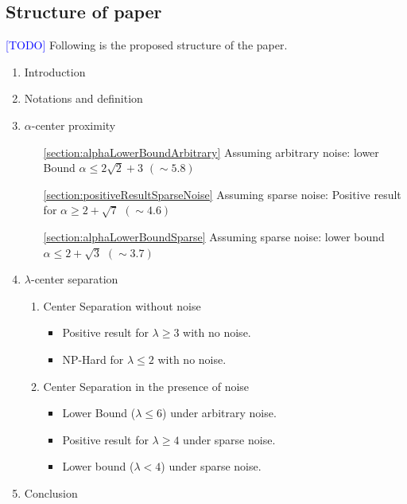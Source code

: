 \documentclass[anon,12pt]{colt2016} %
\newcommand{\todo}{\textcolor{blue}{[TODO]}\xspace}
\begin{document}
\subsection{Structure of paper}
\todo Following is the proposed structure of the paper.
\vspace{-0.1in}\begin{enumerate}
\setlength\itemsep{0em}
\item Introduction
\item Notations and definition
\item $\alpha$-center proximity	\vspace{-0.1in}
	\begin{enumerate}[leftmargin=32pt]
	\renewcommand{\labelenumii}{\theenumii}
	\renewcommand{\theenumii}{\theenumi.\arabic{enumii}.}
	\setlength\itemsep{0em}
	\item[\ref{section:alphaLowerBoundArbitrary}] Assuming arbitrary noise: lower Bound $\alpha \le 2\sqrt{2} + 3$ $(\sim 5.8)$
	\item[\ref{section:positiveResultSparseNoise}] Assuming sparse noise: Positive result for $\alpha \ge 2+\sqrt{7}$ $(\sim 4.6)$
	\item[\ref{section:alphaLowerBoundSparse}] Assuming sparse noise: lower bound $\alpha \le 2+\sqrt{3}$ $(\sim 3.7)$
	\end{enumerate}
\item $\lambda$-center separation \vspace{-0.1in}
	\begin{enumerate}[leftmargin=32pt]
	\renewcommand{\labelenumii}{\theenumii}
	\renewcommand{\theenumii}{\theenumi.\arabic{enumii}.}
	\setlength\itemsep{0em}
	\item Center Separation without noise
	\begin{itemize}
	\item Positive result for $\lambda \ge 3$ with no noise.
	\item NP-Hard for $\lambda \le 2$ with no noise.
	\end{itemize}
	\item Center Separation in the presence of noise \begin{itemize}
	\item Lower Bound ($\lambda \le 6$) under arbitrary noise.
	\item Positive result for $\lambda \ge 4$ under sparse noise.
	\item Lower bound ($\lambda < 4$) under sparse noise.
	\end{itemize}
	\end{enumerate}
\item Conclusion
\end{enumerate}
\end{document}
